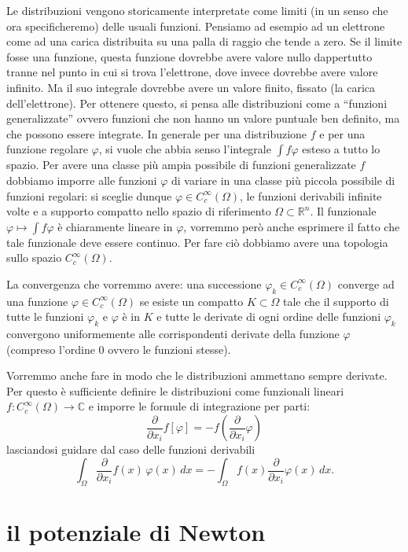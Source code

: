 \documentclass[italian,a4paper,oneside,headinclude]{scrbook}
\renewcommand{\phi}{\varphi}
\newcommand{\CC}{\mathbb C}
\newcommand{\RR}{\mathbb R}
\begin{document}
Le distribuzioni vengono storicamente interpretate come limiti (in un
senso che ora specificheremo) delle usuali funzioni. Pensiamo ad
esempio ad un elettrone come ad una carica distribuita su una palla di
raggio che tende a zero. Se il limite fosse una funzione, questa
funzione dovrebbe avere valore nullo dappertutto tranne nel punto in
cui si trova l'elettrone, dove invece dovrebbe avere valore
infinito. Ma il suo integrale dovrebbe avere un valore finito, fissato
(la carica dell'elettrone). Per ottenere questo, si pensa alle
distribuzioni come a ``funzioni generalizzate'' ovvero funzioni che
non hanno un valore puntuale ben definito, ma che possono essere
integrate. In generale per una distribuzione $f$ e per una funzione
regolare $\phi$, si vuole che abbia senso l'integrale $\int f\phi$
esteso a tutto lo spazio. Per avere una classe più ampia possibile di
funzioni generalizzate $f$ dobbiamo imporre alle funzioni $\phi$ di
variare in una classe più piccola possibile di funzioni regolari: si
sceglie dunque $\phi \in C_c^\infty(\Omega)$, le funzioni derivabili
infinite volte e a supporto compatto nello spazio di riferimento
$\Omega\subset \RR^n$. Il funzionale $\phi \mapsto \int f\phi$ è
chiaramente lineare in $\phi$, vorremmo però anche esprimere il fatto
che tale funzionale deve essere continuo. Per fare ciò
dobbiamo avere una topologia sullo spazio $C_c^\infty(\Omega)$.

La convergenza che vorremmo avere:
una successione $\phi_k\in C_c^\infty(\Omega)$
converge ad una funzione $\phi\in C_c^\infty(\Omega)$ se esiste un
compatto $K\subset \Omega$ tale che il supporto di tutte le funzioni
$\phi_k$ e $\phi$ è in $K$ e tutte le derivate di ogni ordine delle
funzioni $\phi_k$ convergono uniformemente alle corrispondenti
derivate della funzione $\phi$ (compreso l'ordine $0$ ovvero le
funzioni stesse).

Vorremmo anche fare in modo che le distribuzioni ammettano sempre
derivate. Per questo è sufficiente definire le distribuzioni come
funzionali lineari $f\colon C_c^\infty(\Omega)\to \CC$ e imporre le
formule di integrazione per parti:
\[
\frac{\partial}{\partial x_i}f [\phi] = -f(\frac{\partial}{\partial x_i}\phi)
\]
lasciandosi guidare dal caso delle funzioni derivabili
\[
\int_\Omega \frac{\partial}{\partial x_i}f(x)\, \phi(x)\, dx
= - \int_\Omega f(x) \frac{\partial}{\partial x_i}\phi(x)\, dx.
\]

\section{il potenziale di Newton}
\end{document}
